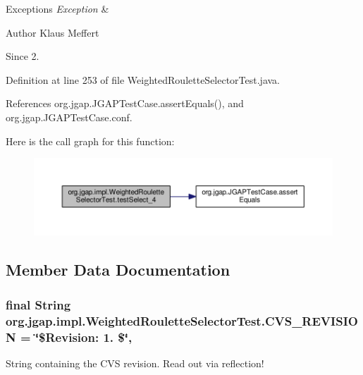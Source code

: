 \begin{DoxyExceptions}{Exceptions}
{\em Exception} & \\
\hline
\end{DoxyExceptions}
\begin{DoxyAuthor}{Author}
Klaus Meffert 
\end{DoxyAuthor}
\begin{DoxySince}{Since}
2. 
\end{DoxySince}


Definition at line 253 of file Weighted\-Roulette\-Selector\-Test.\-java.



References org.\-jgap.\-J\-G\-A\-P\-Test\-Case.\-assert\-Equals(), and org.\-jgap.\-J\-G\-A\-P\-Test\-Case.\-conf.



Here is the call graph for this function\-:
\nopagebreak
\begin{figure}[H]
\begin{center}
\leavevmode
\includegraphics[width=350pt]{classorg_1_1jgap_1_1impl_1_1_weighted_roulette_selector_test_a9be5f6b41c7bb1069cd7ea1be8702587_cgraph}
\end{center}
\end{figure}




\subsection{Member Data Documentation}
\hypertarget{classorg_1_1jgap_1_1impl_1_1_weighted_roulette_selector_test_a7cb1d9272d4e5e23ae32f75971484704}{
\subsubsection[{C\-V\-S\-\_\-\-R\-E\-V\-I\-S\-I\-O\-N}]{\setlength{\rightskip}{0pt plus 5cm}final String org.\-jgap.\-impl.\-Weighted\-Roulette\-Selector\-Test.\-C\-V\-S\-\_\-\-R\-E\-V\-I\-S\-I\-O\-N = \char`\"{}\$Revision\-: 1. \$\char`\"{}\hspace{0.3cm}{\ttfamily [static]}, {\ttfamily [private]}}}\label{classorg_1_1jgap_1_1impl_1_1_weighted_roulette_selector_test_a7cb1d9272d4e5e23ae32f75971484704}
String containing the C\-V\-S revision. Read out via reflection! 

